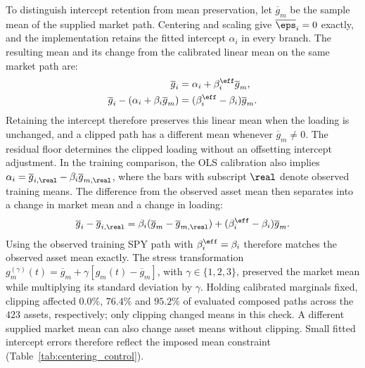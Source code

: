 To distinguish intercept retention from mean preservation, let
$\overline{g}_m$ be the sample mean of the supplied market path.
Centering and scaling give $\overline{\eps}_i=0$ exactly, and the
implementation retains the fitted intercept $\alpha_i$ in every
branch. The resulting mean and its change from the calibrated linear
mean on the same market path are:
\begin{align}
  \overline{g}_i
    &= \alpha_i+\beta_i^{\eff}\overline{g}_m, \notag\\
  \overline{g}_i-(\alpha_i+\beta_i\overline{g}_m)
    &= (\beta_i^{\eff}-\beta_i)\overline{g}_m.
  \label{eq:supp-clipped-mean}
\end{align}
Retaining the intercept therefore preserves this linear mean when the
loading is unchanged, and a clipped path has a different mean whenever
$\overline{g}_m\ne0$. The residual floor determines the clipped loading without an offsetting intercept adjustment. In the training comparison, the OLS
calibration also implies
$\alpha_i=\overline{g}_{i,\real}-\beta_i\overline{g}_{m,\real}$,
where the bars with subscript $\real$ denote observed training means.
The difference from the observed asset mean then separates into a
change in market mean and a change in loading:
\begin{equation}
  \overline{g}_i-\overline{g}_{i,\real}
  = \beta_i(\overline{g}_m-\overline{g}_{m,\real})
    +(\beta_i^{\eff}-\beta_i)\overline{g}_m.
  \label{eq:supp-training-mean-shift}
\end{equation}
Using the observed training SPY path with $\beta_i^{\eff}=\beta_i$
therefore matches the observed asset mean exactly. The stress transformation $g_m^{(\gamma)}(t)=\overline{g}_m+\gamma[g_m(t)-\overline{g}_m]$, with $\gamma\in\{1,2,3\}$, preserved the market mean while multiplying its standard deviation by $\gamma$. Holding calibrated marginals fixed, clipping affected $0.0\%$, $76.4\%$ and $95.2\%$ of evaluated composed paths across the $423$ assets, respectively; only clipping changed means in this check. A different supplied market mean can also change asset means without clipping. Small fitted intercept errors therefore reflect the imposed mean constraint (Table~\ref{tab:centering_control}).

